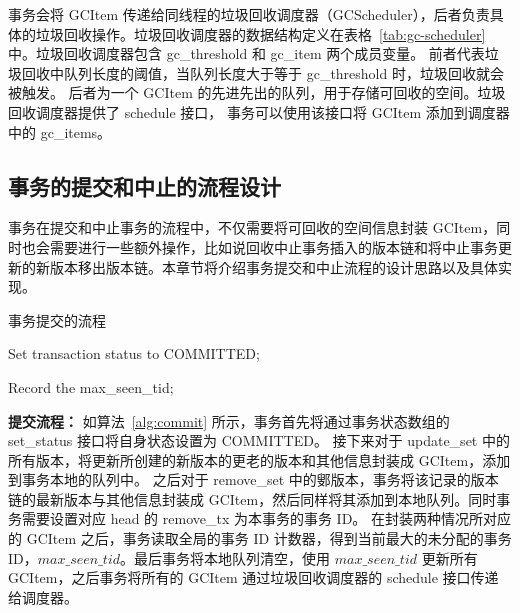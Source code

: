 事务会将 GCItem 传递给同线程的垃圾回收调度器（GCScheduler），后者负责具体的垃圾回收操作。垃圾回收调度器的数据结构定义在表格~\ref{tab:gc-scheduler} 中。垃圾回收调度器包含 gc\_threshold 和 gc\_item 两个成员变量。
前者代表垃圾回收中队列长度的阈值，当队列长度大于等于 gc\_threshold 时，垃圾回收就会被触发。
后者为一个 GCItem 的先进先出的队列，用于存储可回收的空间。垃圾回收调度器提供了 schedule 接口，
事务可以使用该接口将 GCItem 添加到调度器中的 gc\_items。



\subsection{事务的提交和中止的流程设计}
\label{ssec:commit-abort}

事务在提交和中止事务的流程中，不仅需要将可回收的空间信息封装 GCItem，同时也会需要进行一些额外操作，比如说回收中止事务插入的版本链和将中止事务更新的新版本移出版本链。本章节将介绍事务提交和中止流程的设计思路以及具体实现。

\begin{algorithm}[h]
    \caption{事务提交的流程}
    \label{alg:commit}
    \BlankLine
    Set transaction status to COMMITTED;



    Record the max\_seen\_tid;



\end{algorithm}

\textbf{提交流程：} 如算法~\ref{alg:commit} 所示，事务首先将通过事务状态数组的 set\_status 接口将自身状态设置为 COMMITTED。
接下来对于 update\_set 中的所有版本，将更新所创建的新版本的更老的版本和其他信息封装成 GCItem，添加到事务本地的队列中。
之后对于 remove\_set 中的鄋版本，事务将该记录的版本链的最新版本与其他信息封装成 GCItem，然后同样将其添加到本地队列。同时事务需要设置对应 head 的 remove\_tx 为本事务的事务 ID。
在封装两种情况所对应的 GCItem 之后，事务读取全局的事务 ID 计数器，得到当前最大的未分配的事务 ID，$max\_seen\_tid$。最后事务将本地队列清空，使用 $max\_seen\_tid$ 更新所有 GCItem，之后事务将所有的 GCItem 通过垃圾回收调度器的 schedule 接口传递给调度器。


